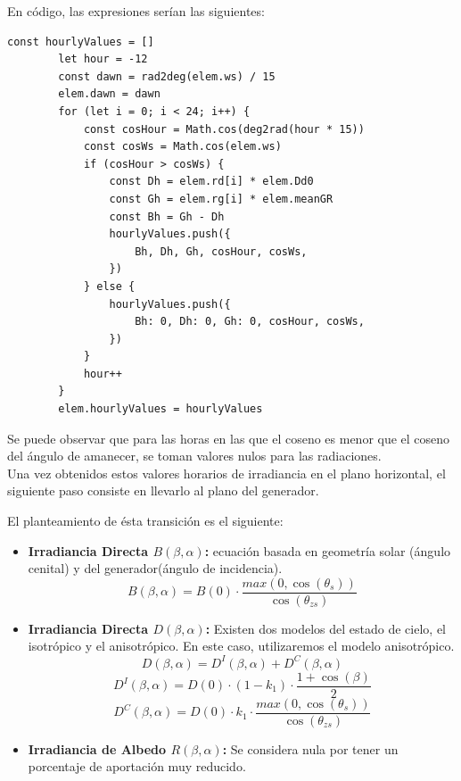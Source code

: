 En código, las expresiones serían las siguientes:

\begin{lstlisting}[style=ES6, caption={Cálculo de rG}]
		const hourlyValues = []
		let hour = -12
		const dawn = rad2deg(elem.ws) / 15
		elem.dawn = dawn
		for (let i = 0; i < 24; i++) {
			const cosHour = Math.cos(deg2rad(hour * 15))
			const cosWs = Math.cos(elem.ws)
			if (cosHour > cosWs) {
				const Dh = elem.rd[i] * elem.Dd0
				const Gh = elem.rg[i] * elem.meanGR
				const Bh = Gh - Dh
				hourlyValues.push({
					Bh, Dh, Gh, cosHour, cosWs,
				})
			} else {
				hourlyValues.push({
					Bh: 0, Dh: 0, Gh: 0, cosHour, cosWs,
				})
			}
			hour++
		}
		elem.hourlyValues = hourlyValues
\end{lstlisting}

Se puede observar que para las horas en las que el coseno es menor que el coseno del ángulo de amanecer, se toman valores nulos para las radiaciones.\\

Una vez obtenidos estos valores horarios de irradiancia en el plano horizontal, el siguiente paso consiste en llevarlo al plano del generador.

El planteamiento de ésta transición es el siguiente:
\begin{itemize}
\item \textbf{Irradiancia Directa $B(\beta,\alpha)$:} ecuación basada en geometría solar (ángulo cenital) y del generador(ángulo de incidencia).
\begin{equation}
\label{eqn:B_beta_alpha}
B(\beta,\alpha) = B(0) \cdot \frac{max(0,\cos(\theta_s))}{\cos(\theta_{zs})}
\end{equation}
\item \textbf{Irradiancia Directa $D(\beta,\alpha)$:} Existen dos modelos del estado de cielo, el isotrópico y el anisotrópico. En este caso, utilizaremos el modelo anisotrópico.
\begin{equation}
D(\beta,\alpha) = D^I(\beta,\alpha)+D^C(\beta,\alpha)
\end{equation}
\begin{equation}
D^I(\beta,\alpha) = D(0)\cdot(1-k_1)\cdot\frac{1+\cos(\beta)}{2}
\end{equation}
\begin{equation}
D^C(\beta,\alpha) = D(0)\cdot k_1 \cdot \frac{max(0, \cos(\theta_s))}{\cos(\theta_{zs})}
\end{equation}
\item \textbf{Irradiancia de Albedo $R(\beta,\alpha)$:} Se considera nula por tener un porcentaje de aportación muy reducido.
\end{itemize}

